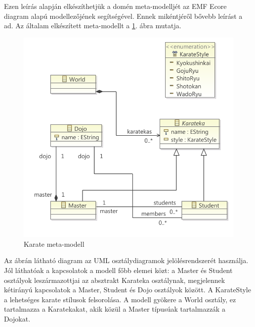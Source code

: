 Ezen leírás alapján elkészíthetjük a domén meta-modelljét az EMF Ecore diagram alapú modellezőjének segítségével.
Ennek mikéntjéről bővebb leírást a \cite{VogelEMF} ad.
Az általam elkészített meta-modellt a \ref{fig:karateMetaModel}. ábra mutatja.
%
\begin{figure}[htb]
\centering
\includegraphics[width=\textwidth]{figures/ecore-karate-metamodel-diag.pdf}
\caption{Karate meta-modell}
\label{fig:karateMetaModel}
\end{figure}
%
Az ábrán látható diagram az UML osztálydiagramok jelölésrendszerét használja.
Jól láthatóak a kapcsolatok a modell főbb elemei közt: a Master és Student osztályok leszármazottjai az absztrakt Karateka osztálynak, megjelennek kétirányú kapcsolatok a Master, Student és Dojo osztályok között.
A KarateStyle a lehetséges karate stílusok felsorolása.
A modell gyökere a World osztály, ez tartalmazza a Karatekakat, akik közül a Master típusúak tartalmazzák a Dojokat.

